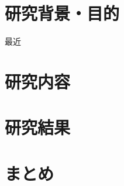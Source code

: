 \documentclass[titlepage]{jarticle}
\begin{document}
\maketitle

\section{研究背景・目的}
最近
\section{研究内容}

\section{研究結果}

\section{まとめ}

\begin{thebibliography}{99}
  \small{





  }
\end{thebibliography}
\end{document}
